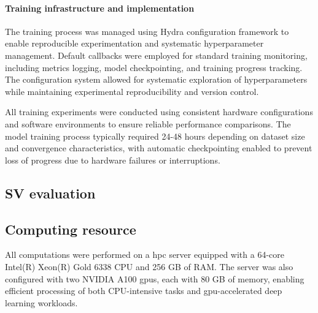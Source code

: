 \documentclass[pdflatex,sn-nature]{sn-jnl}%
\theoremstyle{thmstyleone}%
\theoremstyle{thmstyletwo}%
\theoremstyle{thmstylethree}%
\begin{document}
\paragraph{Training infrastructure and implementation}
The training process was managed using Hydra configuration framework to enable reproducible experimentation and systematic hyperparameter management.
Default callbacks were employed for standard training monitoring, including metrics logging, model checkpointing, and training progress tracking.
The configuration system allowed for systematic exploration of hyperparameters while maintaining experimental reproducibility and version control.

All training experiments were conducted using consistent hardware configurations and software environments to ensure reliable performance comparisons.
The model training process typically required 24-48 hours depending on dataset size and convergence characteristics, with automatic checkpointing enabled to prevent loss of progress due to hardware failures or interruptions.

\subsection*{SV evaluation}


\subsection{Computing resource}

All computations were performed on a \gls{hpc} server equipped with a 64-core Intel(R) Xeon(R) Gold 6338 CPU and 256 GB of RAM.
The server was also configured with two NVIDIA A100 \glspl{gpu}, each with 80 GB of memory, enabling efficient processing of both CPU-intensive tasks and \gls{gpu}-accelerated deep learning workloads.



\backmatter


\makeatletter
\renewcommand{\theHfigure}{extended.\thefigure}
\renewcommand{\theHtable}{extended.\thetable}
\makeatother

\renewcommand{\figurename}{Extended Data Fig.}
\renewcommand{\tablename}{Extended Data Table}
\setcounter{figure}{0}
\setcounter{table}{0}
\end{document}
